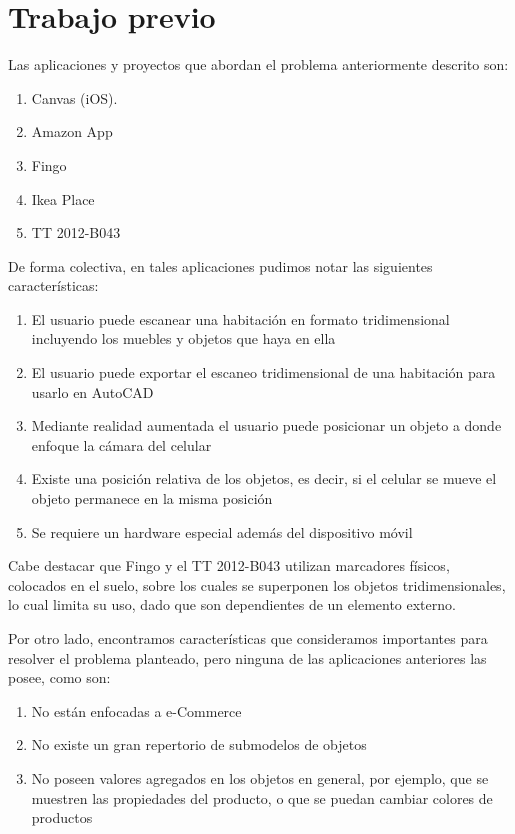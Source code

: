\section{Trabajo previo}
Las aplicaciones y proyectos que abordan el problema anteriormente descrito son:

\begin{enumerate}
	\item Canvas (iOS).
	\item Amazon App
	\item Fingo
	\item Ikea Place
	\item TT 2012-B043
\end{enumerate}

De forma colectiva, en tales aplicaciones pudimos notar las siguientes características:

\begin{enumerate}
	\item El usuario puede escanear una habitación en formato tridimensional incluyendo los muebles y objetos que haya en ella
	\item El usuario puede exportar el escaneo tridimensional de una habitación para usarlo en AutoCAD
	\item Mediante realidad aumentada el usuario puede posicionar un objeto a donde enfoque la cámara del celular
	\item Existe una posición relativa de los objetos, es decir, si el celular se mueve el objeto permanece en la misma posición
	\item Se requiere un hardware especial además del dispositivo móvil
\end{enumerate}

Cabe destacar que Fingo y el TT 2012-B043 utilizan marcadores físicos, colocados en el suelo, sobre los cuales se superponen los objetos tridimensionales, lo cual limita su uso, dado que son dependientes de un elemento externo.\par
Por otro lado, encontramos características que consideramos importantes para resolver el problema planteado, pero ninguna de las aplicaciones anteriores las posee, como son:


\begin{enumerate}
	\item No están enfocadas a e-Commerce
	\item No existe un gran repertorio de submodelos de objetos
	\item No poseen valores agregados en los objetos en general, por ejemplo, que se muestren las propiedades del producto, o que se puedan cambiar colores de productos
\end{enumerate}

